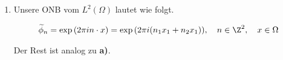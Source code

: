 \begin{solution}
\begin{enumerate}[label = \textbf{\alph*)}]
  \item Unsere ONB vom $L^2(\Omega)$ lautet wie folgt.
  
  \begin{align*}
    \widetilde{\phi}_n
    =
    \exp{(2 \pi i n \cdot x)}
    =
    \exp{(2 \pi i (n_1 x_1 + n_2 x_1))},
    \quad
    n \in \Z^2,
    \quad
    x \in \Omega
  \end{align*}

  Der Rest ist analog zu \textbf{a)}.

\end{enumerate}

\end{solution}

